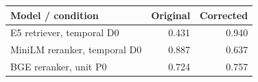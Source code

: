 \begin{tabular}{lrr}
\toprule
Model / condition & Original & Corrected \\
\midrule
E5 retriever, temporal D0 & 0.431 & 0.940 \\
MiniLM reranker, temporal D0 & 0.887 & 0.637 \\
BGE reranker, unit P0 & 0.724 & 0.757 \\
\bottomrule
\end{tabular}
